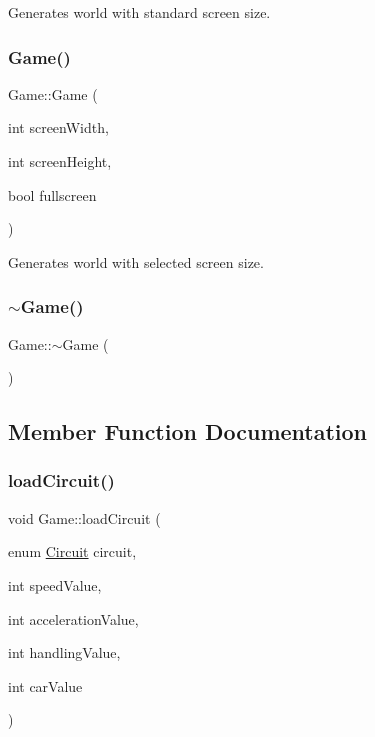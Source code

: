Generates world with standard screen size. 

\mbox{\label{class_game_af2d18d34a602be70fc43b12d52964d07}} 
\subsubsection{\texorpdfstring{Game()}{Game()}\hspace{0.1cm}{\footnotesize\ttfamily [2/2]}}
{\footnotesize\ttfamily Game\+::\+Game (\begin{DoxyParamCaption}\item[{int}]{screen\+Width,  }\item[{int}]{screen\+Height,  }\item[{bool}]{fullscreen }\end{DoxyParamCaption})}



Generates world with selected screen size. 

\mbox{\label{class_game_ae3d112ca6e0e55150d2fdbc704474530}} 
\subsubsection{\texorpdfstring{$\sim$Game()}{~Game()}}
{\footnotesize\ttfamily Game\+::$\sim$\+Game (\begin{DoxyParamCaption}{ }\end{DoxyParamCaption})}



\subsection{Member Function Documentation}
\mbox{\label{class_game_a82cadd0c1af42e957ccdb47e8cf7ff04}} 
\subsubsection{\texorpdfstring{loadCircuit()}{loadCircuit()}}
{\footnotesize\ttfamily void Game\+::load\+Circuit (\begin{DoxyParamCaption}\item[{enum \mbox{\hyperlink{player_8h_a9c0489b2664a5ac943d6f70b3a8dcd67}{Circuit}}}]{circuit,  }\item[{int}]{speed\+Value,  }\item[{int}]{acceleration\+Value,  }\item[{int}]{handling\+Value,  }\item[{int}]{car\+Value }\end{DoxyParamCaption})}



